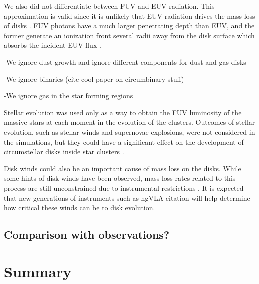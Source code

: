 \documentclass[fleqn,usenatbib]{mnras}
\newcommand\note[1]{{\colorbox{yellow!60}{\color{magenta}#1}}}
\begin{document}
We also did not differentiate between FUV and EUV radiation. This approximation is valid since it is unlikely that EUV radiation drives the mass loss of disks \citep{owen2012}. FUV photons have a much larger penetrating depth than EUV, and the former generate an ionization front several radii away from the disk surface which absorbs the incident EUV flux \citep{adams2004}. 

-We ignore dust growth and ignore different components for dust and gas disks 

-We ignore binaries (cite cool paper on circumbinary stuff)

-We ignore gas in the star forming regions

Stellar evolution was used only as a way to obtain the FUV luminosity of the massive stars at each moment in the evolution of the clusters. Outcomes of stellar evolution, such as stellar winds and supernovae explosions, were not considered in the simulations, but they could have a significant effect on the development of circumstellar disks inside star clusters \citep{close2017,portegieszwart2018,pelupessy2012}.

Disk winds could also be an important cause of mass loss on the disks. While some hints of disk winds have been observed, mass loss rates related to this process are still unconstrained due to instrumental restrictions \citep{pascucci2018}. It is expected that new generations of instruments such as ngVLA \note{citation} will help determine how critical these winds can be to disk evolution.

\subsection{Comparison with observations?}

\section{Summary}
\label{sec:summary}


\bsp	%


\label{lastpage}
\end{document}

